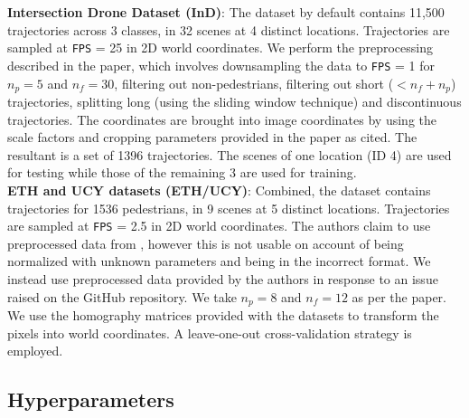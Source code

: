 \textbf{Intersection Drone Dataset (InD)}: \cite{inDdataset} The dataset by default contains 11,500 trajectories across 3 classes, in 32 scenes at 4 distinct locations. Trajectories are sampled at \texttt{FPS} = 25 in 2D world coordinates. We perform the preprocessing described in the paper, which involves downsampling the data to \texttt{FPS} = 1 for $n_p = 5$ and $n_f = 30$, filtering out non-pedestrians, filtering out short ($<n_f+n_p$) trajectories, splitting long (using the sliding window technique) and discontinuous trajectories. The coordinates are brought into image coordinates by using the scale factors and cropping parameters provided in the paper as cited. The resultant is a set of 1396 trajectories. The scenes of one location (ID 4) are used for testing while those of the remaining 3 are used for training.\\

\textbf{ETH and UCY datasets (ETH/UCY)}: Combined, the dataset contains trajectories for 1536 pedestrians, in 9 scenes at 5 distinct locations. Trajectories are sampled at \texttt{FPS} = 2.5 in 2D world coordinates. The authors claim to use preprocessed data from \cite{DBLP:journals/corr/abs-1803-10892}, however this is not usable on account of being normalized with unknown parameters and being in the incorrect format. We instead use preprocessed data provided by the authors in response to an issue raised on the GitHub repository. We take $n_p = 8$ and $n_f = 12$ as per the paper. We use the homography matrices provided with the datasets to transform the pixels into world coordinates. A leave-one-out cross-validation strategy is employed. 



\subsection{Hyperparameters}


